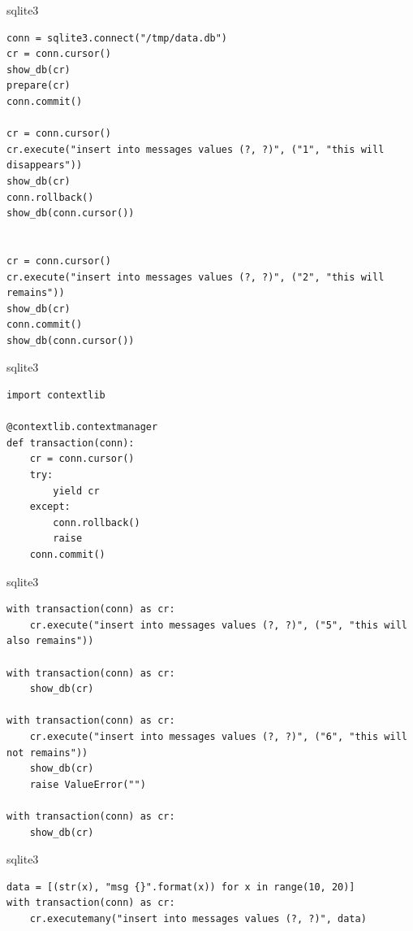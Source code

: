 \documentclass{article}
\begin{document}
\begin{center} sqlite3 \end{center}
\begin{lstlisting}
conn = sqlite3.connect("/tmp/data.db")
cr = conn.cursor()
show_db(cr)
prepare(cr)
conn.commit()

cr = conn.cursor()
cr.execute("insert into messages values (?, ?)", ("1", "this will disappears"))
show_db(cr)
conn.rollback()
show_db(conn.cursor())


cr = conn.cursor()
cr.execute("insert into messages values (?, ?)", ("2", "this will remains"))
show_db(cr)
conn.commit()
show_db(conn.cursor())
\end{lstlisting}
\newpage

\begin{center} sqlite3 \end{center}
\begin{lstlisting}
import contextlib

@contextlib.contextmanager
def transaction(conn):
    cr = conn.cursor()
    try:
        yield cr
    except:
        conn.rollback()
        raise
    conn.commit()
\end{lstlisting}
\newpage


\begin{center} sqlite3 \end{center}
\begin{lstlisting}
with transaction(conn) as cr:
    cr.execute("insert into messages values (?, ?)", ("5", "this will also remains"))

with transaction(conn) as cr:
    show_db(cr)

with transaction(conn) as cr:
    cr.execute("insert into messages values (?, ?)", ("6", "this will not remains"))
    show_db(cr)
    raise ValueError("")

with transaction(conn) as cr:
    show_db(cr)
\end{lstlisting}
\newpage

\begin{center} sqlite3 \end{center}
\begin{lstlisting}
data = [(str(x), "msg {}".format(x)) for x in range(10, 20)]
with transaction(conn) as cr:
    cr.executemany("insert into messages values (?, ?)", data)
\end{lstlisting}
\newpage
\end{document}
